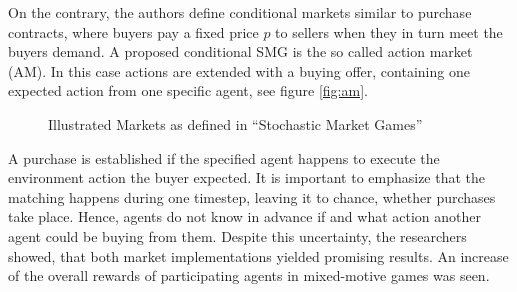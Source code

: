 On the contrary, the authors define conditional markets similar to purchase contracts, where buyers pay a fixed price $p$ to sellers when they in turn meet the buyers demand. A proposed conditional SMG is the so called action market (AM). In this case actions are extended with a buying offer, containing one expected action from one specific agent, see figure \ref{fig:am}.


\begin{figure}[hpbt]
    \centering
    \hspace{0.01\textwidth}
    \caption[Illustrated Markets]{Illustrated Markets as defined in ``Stochastic Market Games''\cite{scbe21}}
    \label{fig:multipic} %
\end{figure}

A purchase is established if the specified agent happens to execute the environment action the buyer expected. It is important to emphasize that the matching happens during one timestep, leaving it to chance, whether purchases take place. Hence, agents do not know in advance if and what action another agent could be buying from them. Despite this uncertainty, the researchers showed, that both market implementations yielded promising results. An increase of the overall rewards of participating agents in mixed-motive games was seen.